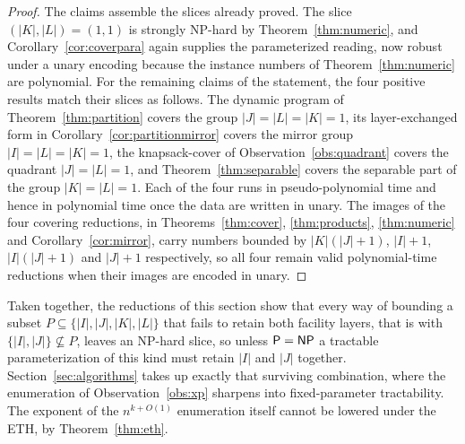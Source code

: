 \begin{proof}
The claims assemble the slices already proved. The slice
$(|K|,|L|)=(1,1)$ is strongly NP-hard by
Theorem~\ref{thm:numeric}, and Corollary~\ref{cor:coverpara} again
supplies the parameterized reading, now robust under a unary encoding because
the instance numbers of Theorem~\ref{thm:numeric} are polynomial. For
the remaining claims of the statement, the four positive results match
their slices as follows. The dynamic program of
Theorem~\ref{thm:partition} covers the group $|J|=|L|=|K|=1$, its
layer-exchanged form in Corollary~\ref{cor:partitionmirror} covers the
mirror group $|I|=|L|=|K|=1$, the
knapsack-cover of Observation~\ref{obs:quadrant} covers the quadrant
$|J|=|L|=1$, and Theorem~\ref{thm:separable} covers the separable
part of the group $|K|=|L|=1$. Each of the four runs in
pseudo-polynomial time and hence in polynomial time once the data are
written in unary. The images of the four covering reductions, in
Theorems~\ref{thm:cover}, \ref{thm:products}, \ref{thm:numeric} and
Corollary~\ref{cor:mirror}, carry numbers bounded by $|K|(|J|+1)$,
$|I|+1$, $|I|(|J|+1)$ and $|J|+1$ respectively, so all four remain valid
polynomial-time reductions when their images are encoded in unary.
\end{proof}

Taken together, the reductions of this section show that every way of
bounding a
subset $P\subseteq\{|I|,|J|,|K|,|L|\}$ that fails to retain both facility
layers, that is with $\{|I|,|J|\}\not\subseteq P$, leaves an NP-hard slice, so unless $\textsf{P}=\textsf{NP}$ a tractable
parameterization of this kind must retain $|I|$ and $|J|$ together. Section~\ref{sec:algorithms} takes
up exactly that surviving combination, where the enumeration of
Observation~\ref{obs:xp} sharpens into fixed-parameter tractability.
The exponent of the $n^{k+O(1)}$ enumeration itself cannot be lowered
under the ETH, by Theorem~\ref{thm:eth}.
